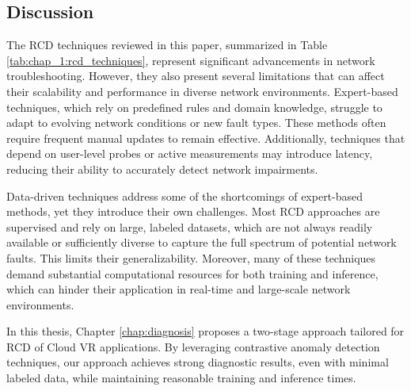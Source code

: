 \subsection{Discussion}


The RCD techniques reviewed in this paper, summarized in Table \ref{tab:chap_1:rcd_techniques}, represent significant advancements in network troubleshooting. However, they also present several limitations that can affect their scalability and performance in diverse network environments. Expert-based techniques, which rely on predefined rules and domain knowledge, struggle to adapt to evolving network conditions or new fault types. These methods often require frequent manual updates to remain effective. Additionally, techniques that depend on user-level probes or active measurements may introduce latency, reducing their ability to accurately detect network impairments.

Data-driven techniques address some of the shortcomings of expert-based methods, yet they introduce their own challenges. Most RCD approaches are supervised and rely on large, labeled datasets, which are not always readily available or sufficiently diverse to capture the full spectrum of potential network faults. This limits their generalizability. Moreover, many of these techniques demand substantial computational resources for both training and inference, which can hinder their application in real-time and large-scale network environments.

In this thesis, Chapter \ref{chap:diagnosis} proposes a two-stage approach tailored for RCD of Cloud VR applications. By leveraging contrastive anomaly detection techniques, our approach achieves strong diagnostic results, even with minimal labeled data, while maintaining reasonable training and inference times.



